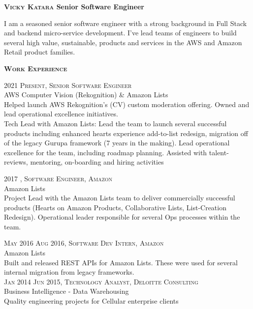 \documentclass[letterpaper,12pt,final]{memoir}
\newcommand{\Sep}{\vspace{1.5em}}
\newcommand{\SmallSep}{\vspace{0.5em}}
\newenvironment{Objective}
	{\ignorespaces\textbf{\color{Plum} Objective}}
	{\Sep\ignorespacesafterend}
\newcommand{\CVSection}[1]
	{\Large\textbf{\textsc{{#1}}}\par
	\SmallSep\normalsize\normalfont}
\newcommand{\CVItem}[1]
	{\textsc{\color{Plum} #1}}
\begin{document}
\Huge\bfseries \textsc{\color{Plum} Vicky Katara}
{\normalsize \bfseries  Senior Software Engineer }
\SmallSep

\normalsize\normalfont

\begin{footnotesize}
I am a seasoned senior software engineer with a strong background in Full Stack and backend micro-service development. I've lead teams of engineers to build several high value, sustainable, products and services in the AWS  and Amazon Retail product families.
\end{footnotesize}

\CVSection{Work Experience}

\CVItem{2021 \textendash \space Present, Senior Software Engineer}\\
\SmallSep
AWS Computer Vision (Rekognition) \& Amazon Lists\\
{\footnotesize Helped launch AWS Rekognition's (CV) custom moderation offering. Owned and lead operational excellence initiatives.\\
Tech Lead with Amazon Lists: Lead the team to launch several successful products including enhanced hearts experience add-to-list redesign, migration off of the legacy Gurupa framework (7 years in the making). Lead operational excellence for the team, including roadmap planning. Assisted with talent-reviews, mentoring, on-boarding and hiring activities}

\CVItem{2017 \textendash {}, Software Engineer, Amazon}\\
\SmallSep
Amazon Lists\\
{\footnotesize Project Lead with the Amazon Lists team to deliver commercially successful products (Hearts on Amazon Products, Collaborative Lists, List-Creation Redesign). Operational leader responsible for several Ops processes within the team.}

\CVItem{May 2016 \textendash \space Aug 2016, Software Dev Intern, Amazon}\\
\SmallSep
Amazon Lists\\
{\footnotesize Built and released REST APIs for Amazon Lists. These were used for several internal migration from legacy frameworks.}
\SmallSep\\
\CVItem{Jan 2014 \textendash \space Jun 2015, Technology Analyst, Deloitte Consulting}\\
\SmallSep
Business Intelligence - Data Warehousing\\
{\footnotesize Quality engineering projects for Cellular enterprise clients}
\SmallSep
\end{document}
